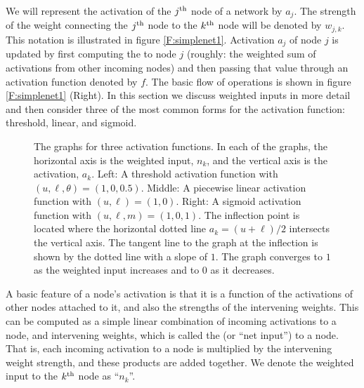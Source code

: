  We will represent the activation of the $j^{\rm th}$ node of a network by $a_j$. The
strength of the weight connecting the $j^{\rm th}$ node to the $k^{\rm th}$  node will be denoted by $w_{j,k}$. This notation is illustrated in figure \ref{F:simplenet1}. Activation $a_j$ of node $j$ is updated by first
computing the  to node $j$  (roughly: the weighted sum of activations from other incoming nodes) and then passing that value through an activation function denoted by $f$. The basic flow of operations is shown in figure \ref{F:simplenet1} (Right). In this section we discuss weighted inputs in more detail and then consider three of the most common forms for the activation function: threshold,
linear, and sigmoid.

\begin{figure}[h]
\centering
{}
\caption[Scott Hotton.]{The graphs for three activation functions. In each of the graphs, the
horizontal axis is the weighted input, $n_k$, and the vertical axis is the
activation, $a_k$. Left: A threshold activation function with $(u,\ell,\theta)
=(1,0,0.5)$. Middle: A piecewise linear activation function with
$(u,\ell)=(1,0)$. Right: A sigmoid activation function with $(u,\ell,m) =
(1,0,1)$. The inflection point is located where the horizontal dotted line
$a_k = (u+\ell)/2$ intersects the vertical axis. The tangent line to the graph
at the inflection is shown by the dotted line with a slope of $1$. The graph
converges to $1$ as the weighted input increases and to $0$ as it decreases.}
\label{activationFunctions}
\end{figure}


A basic feature of a node's activation is that it is a function of the activations of other nodes attached to it, and also the strengths of the intervening weights. This can be computed as a simple linear combination of incoming activations to a node, and intervening weights, which is called the   (or ``net input'') to a node. That is, each incoming activation to a node is multiplied by the intervening weight strength, and these products are added together. We denote the weighted input to the $k^{\rm th}$ node as ``$n_k$''.

